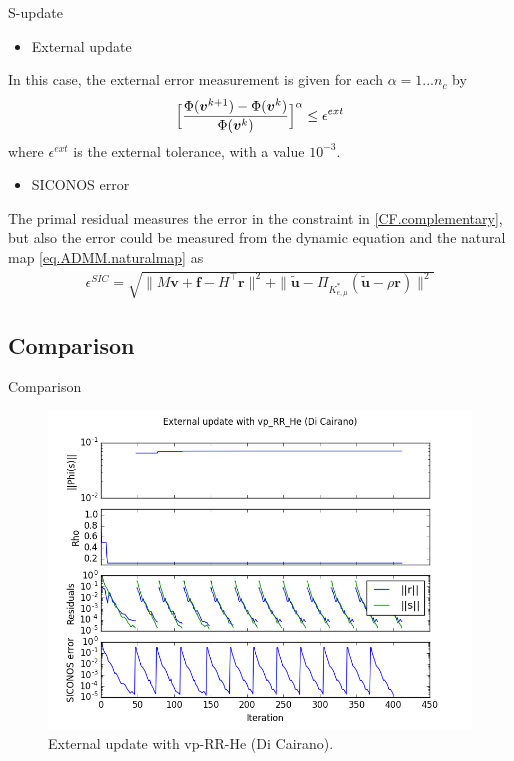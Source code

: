 \documentclass[8pt,red]{beamer}
\theoremstyle{plain}
\theoremstyle{definition}
\theoremstyle{remark}
\newcommand{\bi}[1]{\ensuremath{\boldsymbol{#1}}}
\begin{document}
\begin{frame}{S-update}
\begin{itemize}
\item External update
\end{itemize}
In this case, the external error measurement is given for each $\alpha = 1 ... n_{c}$ by 
\begin{align}
	\Bigl[ \frac{\Phi(\bi{v}^{k+1}) - \Phi(\bi{v}^{k})}{\Phi(\bi{v}^{k})} \Bigr]^{\alpha} \leq \epsilon^{ext} \label{eq.stopcriterionexternal}
\end{align}
where $\epsilon^{ext}$ is the external tolerance, with a value $10^{-3}$.

\begin{itemize}
\item SICONOS error
\end{itemize}
The primal residual measures the error in the constraint in \eqref{CF.complementary}, but also the error could be measured from the dynamic equation and the natural map \eqref{eq.ADMM.naturalmap} as
\begin{align}
\epsilon^{SIC} = \sqrt{\| M \bi{v} + \bi{f} - H^{\top} \bi{r} \|^{2} + \| \tilde{\bi{u}} - \Pi_{K_{e,\mu}^{*}}(\tilde{\bi{u}} - \rho \bi{r}) \|^{2}}
\end{align}
\end{frame}

\subsection{Comparison}

\begin{frame}{Comparison}
\begin{figure}[hbtp]
\centering
\includegraphics[scale=0.4]{Results/S_update/External13.png}
\caption{External update with vp-RR-He (Di Cairano).}
\end{figure}
\end{frame}
\end{document}
